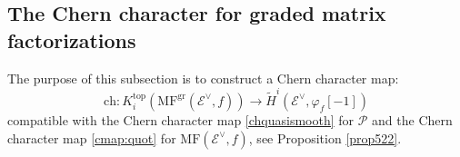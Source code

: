\documentclass [11pt,oneside,a4paper,mathscr]{amsart}
\newtheorem{prop}[thm]{Proposition}
\theoremstyle{definition}
\begin{document}
\subsection{The Chern character for graded matrix factorizations}




    
The purpose of this subsection is to construct a Chern character map:
\begin{equation}\label{def:cherncharactergr}
\mathrm{ch}\colon K^{\mathrm{top}}_i(\mathrm{MF}^{\mathrm{gr}}(\mathscr{E}^\vee, f))\to \widetilde{H}^i(\mathscr{E}^\vee, \varphi_f[-1])
\end{equation}
compatible with the Chern character map \eqref{chquasismooth} for $\mathscr{P}$ and the Chern character map \eqref{cmap:quot} for $\mathrm{MF}(\mathscr{E}^\vee, f)$, see Proposition \ref{prop522}. 
\end{document}

